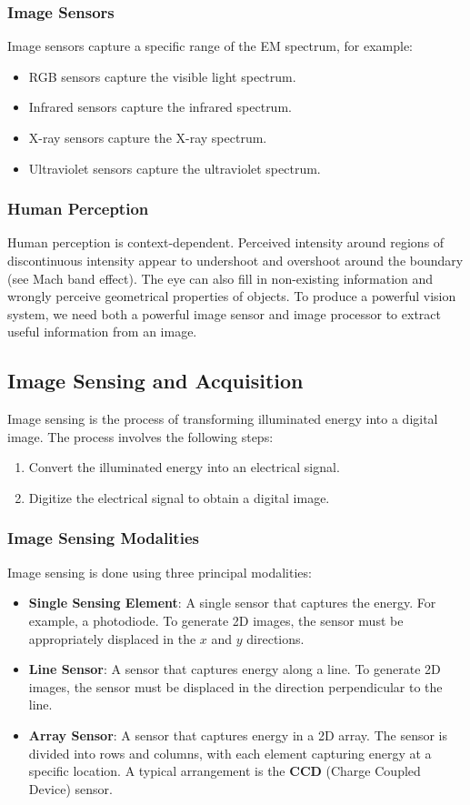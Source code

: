 \documentclass{article}
\begin{document}
\subsubsection{Image Sensors}
Image sensors capture a specific range of the EM spectrum, for example:
\begin{itemize}
    \item RGB sensors capture the visible light spectrum.
    \item Infrared sensors capture the infrared spectrum.
    \item X-ray sensors capture the X-ray spectrum.
    \item Ultraviolet sensors capture the ultraviolet spectrum.
\end{itemize}
\subsubsection{Human Perception}
Human perception is context-dependent. Perceived intensity around
regions of discontinuous intensity appear to undershoot and overshoot
around the boundary (see Mach band effect). The eye can also fill in
non-existing information and wrongly perceive geometrical properties of
objects. To produce a powerful vision system, we need both a powerful
image sensor and image processor to extract useful information from an
image.
\subsection{Image Sensing and Acquisition}
Image sensing is the process of transforming illuminated energy into a
digital image. The process involves the following steps:
\begin{enumerate}
    \item Convert the illuminated energy into an electrical signal.
    \item Digitize the electrical signal to obtain a digital image.
\end{enumerate}
\subsubsection{Image Sensing Modalities}
Image sensing is done using three principal modalities:
\begin{itemize}
    \item \textbf{Single Sensing Element}: A single sensor that
          captures the energy. For example, a photodiode. To
          generate 2D images, the sensor must be appropriately
          displaced in the \(x\) and \(y\) directions.
    \item \textbf{Line Sensor}: A sensor that captures energy
          along a line. To generate 2D images, the sensor must
          be displaced in the direction perpendicular to the
          line.
    \item \textbf{Array Sensor}: A sensor that captures energy
          in a 2D array. The sensor is divided into rows and
          columns, with each element capturing energy at a
          specific location. A typical arrangement is the
          \textbf{CCD} (Charge Coupled Device) sensor.
\end{itemize}
\end{document}
